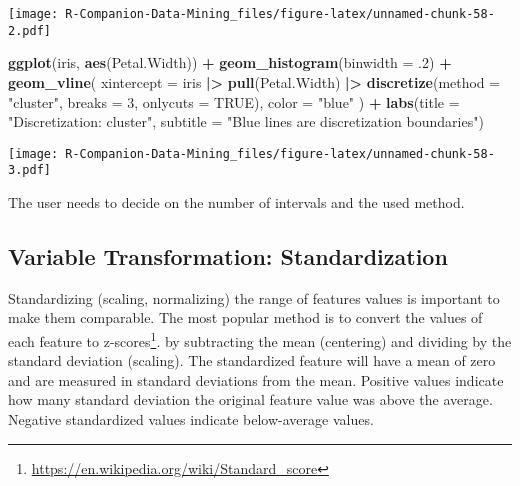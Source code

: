 \documentclass[
  notitlepage]{book}
\newenvironment{Shaded}{\begin{snugshade}}{\end{snugshade}}
\newcommand{\DataTypeTok}[1]{\textcolor[rgb]{0.13,0.29,0.53}{#1}}
\newcommand{\DecValTok}[1]{\textcolor[rgb]{0.00,0.00,0.81}{#1}}
\newcommand{\ErrorTok}[1]{\textcolor[rgb]{0.64,0.00,0.00}{\textbf{#1}}}
\newcommand{\FloatTok}[1]{\textcolor[rgb]{0.00,0.00,0.81}{#1}}
\newcommand{\KeywordTok}[1]{\textcolor[rgb]{0.13,0.29,0.53}{\textbf{#1}}}
\newcommand{\NormalTok}[1]{#1}
\newcommand{\OperatorTok}[1]{\textcolor[rgb]{0.81,0.36,0.00}{\textbf{#1}}}
\newcommand{\OtherTok}[1]{\textcolor[rgb]{0.56,0.35,0.01}{#1}}
\newcommand{\StringTok}[1]{\textcolor[rgb]{0.31,0.60,0.02}{#1}}
\DeclareRobustCommand{\href}[2]{#2\footnote{\url{#1}}}
\begin{document}
\texttt{[image: R-Companion-Data-Mining\_files/figure-latex/unnamed-chunk-58-2.pdf]}

\begin{Shaded}
\begin{Highlighting}[]
\KeywordTok{ggplot}\NormalTok{(iris, }\KeywordTok{aes}\NormalTok{(Petal.Width)) }\OperatorTok{+}\StringTok{ }\KeywordTok{geom\_histogram}\NormalTok{(}\DataTypeTok{binwidth =} \FloatTok{.2}\NormalTok{) }\OperatorTok{+}
\StringTok{  }\KeywordTok{geom\_vline}\NormalTok{(}
    \DataTypeTok{xintercept =}\NormalTok{ iris }\OperatorTok{|}\ErrorTok{\textgreater{}}\StringTok{ }
\StringTok{    }\KeywordTok{pull}\NormalTok{(Petal.Width) }\OperatorTok{|}\ErrorTok{\textgreater{}}\StringTok{ }
\StringTok{    }\KeywordTok{discretize}\NormalTok{(}\DataTypeTok{method =} \StringTok{"cluster"}\NormalTok{, }\DataTypeTok{breaks =} \DecValTok{3}\NormalTok{, }\DataTypeTok{onlycuts =} \OtherTok{TRUE}\NormalTok{),}
   \DataTypeTok{color =} \StringTok{"blue"}
\NormalTok{  ) }\OperatorTok{+}
\StringTok{  }\KeywordTok{labs}\NormalTok{(}\DataTypeTok{title =} \StringTok{"Discretization: cluster"}\NormalTok{, }
       \DataTypeTok{subtitle =} \StringTok{"Blue lines are discretization boundaries"}\NormalTok{)}
\end{Highlighting}
\end{Shaded}

\texttt{[image: R-Companion-Data-Mining\_files/figure-latex/unnamed-chunk-58-3.pdf]}

The user needs to decide on the number of intervals and the used method.

\hypertarget{variable-transformation-standardization}{%
\subsection{Variable Transformation: Standardization}\label{variable-transformation-standardization}}

Standardizing (scaling, normalizing) the range of features values is
important to make them comparable. The most popular method is to convert
the values of each feature to
\href{https://en.wikipedia.org/wiki/Standard_score}{z-scores}. by subtracting
the mean (centering) and dividing by the standard deviation (scaling).
The standardized feature will have a mean of zero and are measured in
standard deviations from the mean. Positive values indicate how many
standard deviation the original feature value was above the average.
Negative standardized values indicate below-average values.
\end{document}
